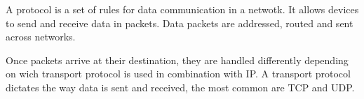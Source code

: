 A protocol is a set of rules for data communication in a netwotk. It allows devices to send and receive data in packets. Data packets are addressed, routed and sent across networks.

Once packets arrive at their destination, they are handled differently depending on wich transport protocol is used in combination with IP. A transport protocol dictates the way data is sent and received, the most common are TCP and UDP.
